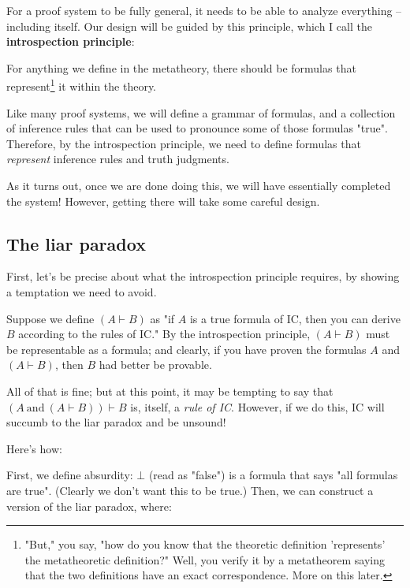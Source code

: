 \documentclass{article}
\begin{document}
  For a proof system to be fully general, it needs to be able to analyze everything – including itself. Our design will be guided by this principle, which I call the \textbf{introspection principle}:
  
  \begin{center}
    For anything we define in the metatheory, there should be formulas that represent\footnote{"But," you say, "how do you know that the theoretic definition 'represents' the metatheoretic definition?" Well, you verify it by a metatheorem saying that the two definitions have an exact correspondence. More on this later.} it within the theory.
  \end{center}
  
  Like many proof systems, we will define a grammar of formulas, and a collection of inference rules that can be used to pronounce some of those formulas "true". Therefore, by the introspection principle, we need to define formulas that \emph{represent} inference rules and truth judgments.
  
  As it turns out, once we are done doing this, we will have essentially completed the system! However, getting there will take some careful design.
  
  \subsection{The liar paradox}
  
  First, let's be precise about what the introspection principle requires, by showing a temptation we need to avoid.
  
  Suppose we define $(A \vdash B)$ as "if $A$ is a true formula of IC, then you can derive $B$ according to the rules of IC." By the introspection principle, $(A \vdash B)$ must be representable as a formula; and clearly, if you have proven the formulas $A$ and $(A \vdash B)$, then $B$ had better be provable.
  
  \newcommand{\strongmp}{(A\ \mathrm{and}\ (A \vdash B)) \vdash B}
  All of that is fine; but at this point, it may be tempting to say that $\strongmp$ is, itself, a \emph{rule of IC}. However, if we do this, IC will succumb to the liar paradox and be unsound!
  
  Here's how:
  
  First, we define absurdity: $\bot$ (read as "false") is a formula that says "all formulas are true".
  (Clearly we don't want this to be true.)
  Then, we can construct a version of the liar paradox, where:
  
\end{document}
